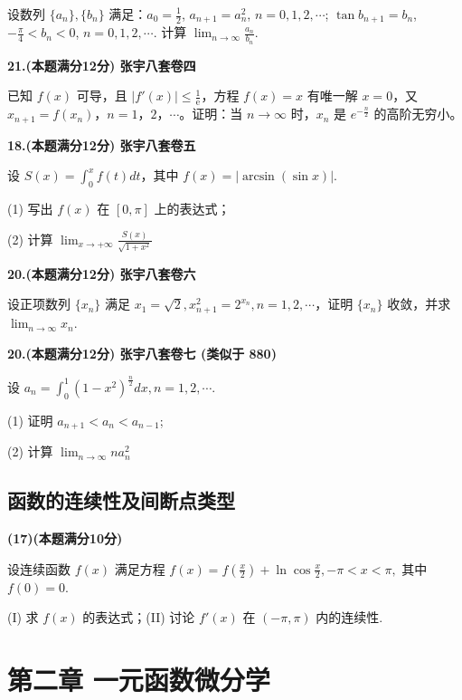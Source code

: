 \documentclass[a4paper,12pt]{article}
\begin{document}
设数列 $\{a_n\}, \{b_n\}$ 满足：$a_0 = \frac{1}{2}$, $a_{n+1} = a_n^2$, $n = 0, 1, 2, \cdots$; $\tan b_{n+1} = b_n$, $-\frac{\pi}{4} < b_n < 0$, $n = 0, 1, 2, \cdots$. 计算 $\lim_{n \to \infty} \frac{a_n}{b_n}$.

\vspace{0.5cm}

\textbf{21.(本题满分12分) 张宇八套卷四}

已知 $f(x)$ 可导，且 $\left|f'(x)\right| \leqslant \frac{1}{\mathrm{e}}$，方程 $f(x) = x$ 有唯一解 $x = 0$，又 $x_{n+1} = f(x_n)$，$n = 1，2，\cdots$。证明：当 $n \to \infty$ 时，$x_n$ 是 $e^{-\frac{n}{2}}$ 的高阶无穷小。

\vspace{0.5cm}

\textbf{18.(本题满分12分) 张宇八套卷五}

设 $S(x)=\int_{0}^{x}f(t)dt$，其中 $f(x)=\left|\arcsin(\sin x)\right|$.

(1) 写出 $f(x)$ 在 $[0, \pi]$ 上的表达式；

(2) 计算 $\lim_{x\to+\infty}\frac{S(x)}{\sqrt{1+x^2}}$

\vspace{0.5cm}

\textbf{20.(本题满分12分) 张宇八套卷六}

设正项数列 $\{x_{n}\}$ 满足 $x_{1}=\sqrt{2}, x_{n+1}^{2}=2^{x_{n}}, n=1,2,\cdots$，证明 $\{x_{n}\}$ 收敛，并求 $\lim_{n\to\infty}x_{n}$.

\vspace{0.5cm}

\textbf{20.(本题满分12分) 张宇八套卷七 (类似于 880)}

设 $a_{n}=\int_{0}^{1}(1-x^{2})^{\frac{n}{2}}dx,n=1,2,\cdots.$

(1) 证明 $a_{n+1} < a_n < a_{n-1}$;

(2) 计算 $\lim_{n\to\infty}na_{n}^{2}$

\subsection{函数的连续性及间断点类型}

\textbf{(17)(本题满分10分)}

设连续函数 $f(x)$ 满足方程 $f(x)=f\left(\frac{x}{2}\right)+\ln\cos\frac{x}{2},-\pi<x<\pi,$ 其中 $f(0)=0$.

(I) 求 $f(x)$ 的表达式；(II) 讨论 $f'(x)$ 在 $(- \pi, \pi)$ 内的连续性.

\section{第二章 一元函数微分学}
\end{document}
